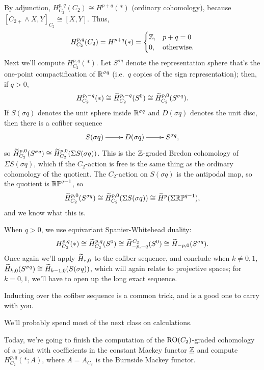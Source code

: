 By adjunction, $H_{C_2}^{p,q}(C_2)\cong H^{p+q}(*)$ (ordinary cohomology), because $[C_{2+}\wedge X, Y]_{C_2}\cong
[X,Y]$. Thus,
\[H_{C_2}^{p,q}(C_2) = H^{p+q}(*) = \begin{cases}
	\mathbb Z, &p+q=0\\
	0, &\text{otherwise.}
\end{cases}\]
Next we'll compute $H_{C_2}^{p,q}(*)$. Let $S^{\sigma q}$ denote the representation sphere that's the one-point
compactification of $\mathbb R^{\sigma q}$ (i.e.\ $q$ copies of the sign representation); then, if $q > 0$,
\[H_{C_2}^{p,-q}(*)\cong \widetilde H_{C_2}^{p,-q}(S^0)\cong \widetilde H_{C_2}^{p,0}(S^{\sigma q}).\]
If $S(\sigma q)$ denotes the unit sphere inside $\mathbb R^{\sigma q}$ and $D(\sigma q)$ denotes the unit disc, then there
is a cofiber sequence
\begin{equation}
\label{signed_cofiber}
\xymatrix{
	S(\sigma q)\ar[r] & D(\sigma q)\ar[r] & S^{\sigma q},
}
\end{equation}
so $\widetilde H_{C_2}^{p,0}(S^{\sigma q})\cong\widetilde H_{C_2}^{p,0}(\Sigma S(\sigma q))$. This is the $\mathbb Z$-graded Bredon
cohomology of $\Sigma S(\sigma q)$, which if the $C_2$-action is free is the same thing as the ordinary cohomology
of the quotient. The $C_2$-action on $S(\sigma q)$ is the antipodal map, so the quotient is $\mathbb{RP}^{q-1}$, so
\[\widetilde H_{C_2}^{p,0}(S^{\sigma q})\cong \widetilde H_{C_2}^{p,0}(\Sigma S(\sigma q))\cong \widetilde H^p(\Sigma\mathbb{RP}^{q-1}),\]
and we know what this is.

When $q > 0$, we use equivariant Spanier-Whitehead duality:
\[H_{C_2}^{p,q}(*)\cong \widetilde H_{C_2}^{p,q}(S^0)\cong \widetilde H_{-p,-q}^{C_2}(S^0)\cong \widetilde H_{-p,0}(S^{\sigma q}).\]
Once again we'll apply $\widetilde H_{*,0}$ to the cofiber sequence, and conclude when $k\ne 0,1$, $\widetilde H_{k,0}(S^{\sigma
q})\cong \widetilde H_{k-1,0}(S(\sigma q))$, which will again relate to projective spaces; for $k = 0,1$, we'll have to open
up the long exact sequence.

Inducting over the cofiber sequence is a common trick, and is a good one to carry with you.

We'll probably spend most of the next class on calculations.


Today, we're going to finish the computation of the $\mathrm{RO}(C_2)$-graded cohomology of a point with coefficients in
the constant Mackey functor $\underline{\mathbb Z}$ and compute $H_{C_2}^{p,q}(*; A)$, where $A = A_{C_2}$ is the Burnside
Mackey functor.

